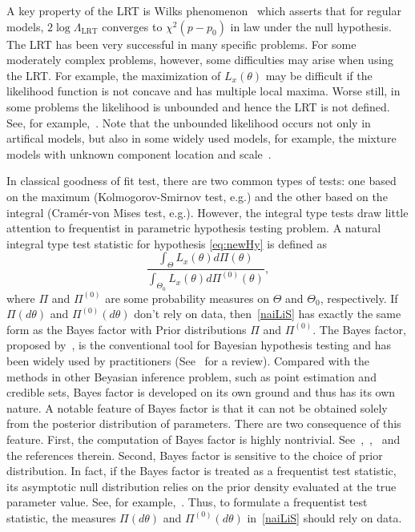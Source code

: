 \documentclass[11pt]{article}
\theoremstyle{plain}
\theoremstyle{definition}
\theoremstyle{remark}
\begin{document}
A key property of the LRT is Wilks phenomenon~\citep{Wilks1938The} which asserts that for regular models, $2\log \Lambda_{\text{LRT}}$ converges to $\chi^2(p-p_0)$ in law under the null hypothesis.
The LRT has been very successful in many specific problems.
For some moderately complex problems, however, some difficulties may arise when using the LRT.
For example, the maximization of $L_x(\theta)$ may be difficult if the likelihood function is not concave and has multiple local maxima.
Worse still, in some problems the likelihood is unbounded and hence the LRT is not defined.
See, for example,~\cite{Cam1990Maximum}.
Note that the unbounded likelihood occurs not only in artifical models, but also in some widely used models, for example, the mixture models with unknown component location and scale~\citep{chenjiahua2017}.

In classical goodness of fit test, there are two common types of tests: one based on the maximum (Kolmogorov-Smirnov test, e.g.) and the other based on the integral (Cram\'er-von Mises test, e.g.).
However, the integral type tests draw little attention to frequentist in parametric hypothesis testing problem.
A natural integral type test statistic for hypothesis \eqref{eq:newHy} is defined as
\begin{equation}\label{naiLiS}
\frac{\int_{\Theta}L_x(\theta) d\Pi(\theta)}{\int_{\Theta_0} L_x(\theta) d\Pi^{(0)}(\theta)},
\end{equation}
where $\Pi$ and $\Pi^{(0)}$ are some probability measures on $\Theta$ and $\Theta_{0}$, respectively.
If $\Pi(d\theta)$ and $\Pi^{(0)}(d\theta)$ don't rely on data, then~\eqref{naiLiS} has exactly the same form as the Bayes factor with Prior distributions $\Pi$ and $\Pi^{(0)}$.
The Bayes factor, proposed by~\cite{scientificInference}, is the conventional tool for Bayesian hypothesis testing and has been widely used by practitioners (See~\cite{Robert1995Bayes} for a review).
Compared with the methods in other Beyasian inference problem, such as point estimation and credible sets, Bayes factor is developed on its own ground and thus has its own nature.
A notable feature of Bayes factor is that it can not be obtained solely from the posterior distribution of parameters.
There are two consequence of this feature.
First, the computation of Bayes factor is highly nontrivial.
See~\cite{Robert1995Bayes},~\cite{MarkovC},~\cite{raftery2006estimating} and the references therein.
Second, Bayes factor is sensitive to the choice of prior distribution. 
In fact, if the Bayes factor is treated as a frequentist test statistic,
 its asymptotic null distribution relies on the prior density evaluated at the true parameter value.
See, for example,~\cite{clarke1990information}.
Thus, to formulate a frequentist test statistic, the measures $\Pi(d\theta)$ and $\Pi^{(0)}(d\theta)$ in~\eqref{naiLiS} should rely on data.
\end{document}
